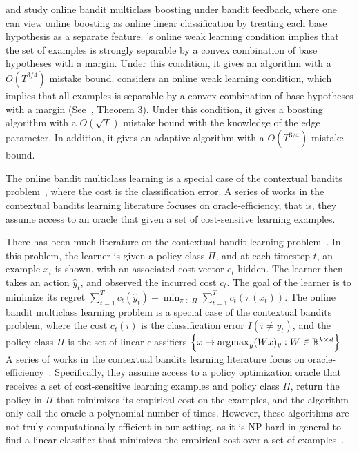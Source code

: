 \citet{Chen-Lin-Lu-2014} and \citet{Zhang-Jung-Tewari-2018} study online bandit
multiclass boosting under bandit feedback, where one can view online boosting as
online linear classification by treating each base hypothesis as a separate
feature. \citet{Chen-Lin-Lu-2014}'s online weak learning condition implies that
the set of examples is strongly separable by a convex combination of base
hypotheses with a margin. Under this condition, it gives an algorithm with a
$O(T^{3/4})$ mistake bound. \citet{Zhang-Jung-Tewari-2018} considers an online
weak learning condition, which implies that all examples is separable by a
convex combination of base hypotheses with a margin
(See~\cite{Mukherjee-Schapire-2013}, Theorem 3). Under this condition, it gives
a boosting algorithm with a $O(\sqrt{T})$ mistake bound with the knowledge of
the edge parameter. In addition, it gives an adaptive algorithm with a
$O(T^{3/4})$ mistake bound.

The online bandit multiclass learning is a special case of the contextual
bandits problem~\citep{Auer-2003, Langford-Zhang-2008}, where the cost is the
classification error. A series of works in the contextual bandits learning
literature focuses on oracle-efficiency, that is, they assume access to an
oracle that given a set of cost-sensitve learning examples.

There has been much literature on the contextual bandit learning
problem~\citep{Auer-2003, Langford-Zhang-2008}. In this problem, the learner is
given a policy class $\Pi$, and at each timestep $t$, an example $x_t$ is shown,
with an associated cost vector $c_t$ hidden. The learner then takes an action
$\hat{y}_t$, and observed the incurred cost $c_t$. The goal of the learner is to
minimize its regret $\sum_{t=1}^T c_t(\hat{y}_t) - \min_{\pi \in \Pi}
\sum_{t=1}^T c_t(\pi(x_t))$. The online bandit multiclass learning problem is a
special case of the contextual bandits problem, where the cost $c_t(i)$ is the
classification error $I(i \neq y_t)$, and the policy class $\Pi$ is the set of
linear classifiers $\cbr{x \mapsto \argmax_y (Wx)_y: W \in \R^{k \times d}}$. A
series of works in the contextual bandits learning literature focus on
oracle-efficiency~\citep{Dudik-Hsu-Kale-Karampatziakis-Langford-Reyzin-Zhang-2011,
Agarwal-Hsu-Kale-Langford-Li-Schapire-2014, Rakhlin-Sridharan-2016,
Syrgkanis-Krishnamurthy-Schapire-2016,
Syrgkanis-Luo-Krishnamurthy-Schapire-2016}. Specifically, they assume access to
a policy optimization oracle that receives a set of cost-sensitive learning
examples and policy class $\Pi$, return the policy in $\Pi$ that minimizes its
empirical cost on the examples, and the algorithm only call the oracle a
polynomial number of times. However, these algorithms are not truly
computationally efficient in our setting, as it is NP-hard in general to find a
linear classifier that minimizes the empirical cost over a set of
examples~\citep{Arora-Babai-Stern-Sweedyk-1997}.


